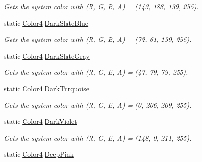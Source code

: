 \begin{DoxyCompactItemize}
\begin{DoxyCompactList}\small\item\em Gets the system color with (R, G, B, A) = (143, 188, 139, 255). \end{DoxyCompactList}\item 
static \hyperlink{struct_open_t_k_1_1_graphics_1_1_color4}{Color4} \hyperlink{struct_open_t_k_1_1_graphics_1_1_color4_adf181fb3690e35eb5c01c7bf8c5879eb}{Dark\-Slate\-Blue}
\begin{DoxyCompactList}\small\item\em Gets the system color with (R, G, B, A) = (72, 61, 139, 255). \end{DoxyCompactList}\item 
static \hyperlink{struct_open_t_k_1_1_graphics_1_1_color4}{Color4} \hyperlink{struct_open_t_k_1_1_graphics_1_1_color4_aaf1b688f02b4a3f323210c986cd86c09}{Dark\-Slate\-Gray}
\begin{DoxyCompactList}\small\item\em Gets the system color with (R, G, B, A) = (47, 79, 79, 255). \end{DoxyCompactList}\item 
static \hyperlink{struct_open_t_k_1_1_graphics_1_1_color4}{Color4} \hyperlink{struct_open_t_k_1_1_graphics_1_1_color4_a8e6f6bf1c4c1b2f2f2cfd9a6796e6491}{Dark\-Turquoise}
\begin{DoxyCompactList}\small\item\em Gets the system color with (R, G, B, A) = (0, 206, 209, 255). \end{DoxyCompactList}\item 
static \hyperlink{struct_open_t_k_1_1_graphics_1_1_color4}{Color4} \hyperlink{struct_open_t_k_1_1_graphics_1_1_color4_a9cf40745b8ea6323f2cf317d0046e1a5}{Dark\-Violet}
\begin{DoxyCompactList}\small\item\em Gets the system color with (R, G, B, A) = (148, 0, 211, 255). \end{DoxyCompactList}\item 
static \hyperlink{struct_open_t_k_1_1_graphics_1_1_color4}{Color4} \hyperlink{struct_open_t_k_1_1_graphics_1_1_color4_a4d44a932f5fcdcc9912a70656123a470}{Deep\-Pink}

\end{DoxyCompactItemize}

